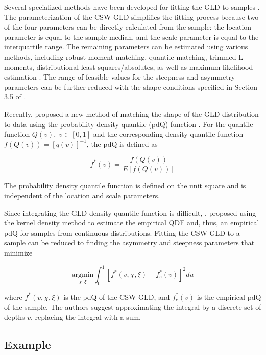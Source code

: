 \documentclass[
  fleqn,
  deca,
  blindrev
]{informs4}
\begin{document}
Several specialized methods have been developed for fitting the GLD to
samples \citep{karian2003ComparisonGLDFitting}. The parameterization of
the CSW GLD simplifies the fitting process because two of the four
parameters can be directly calculated from the sample: the location
parameter is equal to the sample median, and the scale parameter is
equal to the interquartile range. The remaining parameters can be
estimated using various methods, including robust moment matching,
quantile matching, trimmed L-moments, distributional least
squares/absolutes, as well as maximum likelihood estimation
\citep{chalabi2012FlexibleDistributionModeling, gilchrist2000StatisticalModellingQuantile}.
The range of feasible values for the steepness and asymmetry parameters
can be further reduced with the shape conditions specified in Section
3.5 of \citep{chalabi2012FlexibleDistributionModeling}.

Recently, \citep{dedduwakumara2021EfficientEstimatorParameters} proposed
a new method of matching the shape of the GLD distribution to data using
the probability density quantile (pdQ) function
\citep{staudte2017ShapesThingsCome}. For the quantile function
\(Q(v), \; v\in [0,1]\) and the corresponding density quantile function
\(f(Q(v))=[q(v)]^{-1}\), the pdQ is defined as

\[
f^*(v)=\frac{f(Q(v))}{E\left[f(Q(v))\right]}
\]

The probability density quantile function is defined on the unit square
and is independent of the location and scale parameters.

Since integrating the GLD density quantile function is difficult,
\citep[Section 2.2]{staudte2017ShapesThingsCome}, proposed using the
kernel density method to estimate the empirical QDF and, thus, an
empirical pdQ for samples from continuous distributions. Fitting the CSW
GLD to a sample can be reduced to finding the asymmetry and steepness
parameters that minimize

\[
\underset{\chi,\xi}{\text{argmin}}\int_0^1\left[f^*(v, \chi, \xi)-f_{e}^*(v)\right]^2du
\]

where \(f^*(v,\chi,\xi)\) is the pdQ of the CSW GLD, and \(f^*_e(v)\) is
the empirical pdQ of the sample. The authors
\citep{dedduwakumara2021EfficientEstimatorParameters} suggest
approximating the integral by a discrete set of depths \(v\), replacing
the integral with a sum.

\subsection{Example}\label{sec-qmexample}
\end{document}
